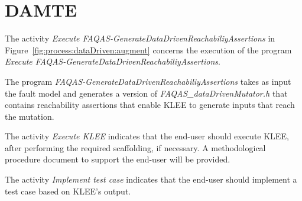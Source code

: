 

\section{DAMTE}


The activity \emph{Execute FAQAS-GenerateDataDrivenReachabiliyAssertions} in Figure~\ref{fig:process:dataDriven:augment} concerns the execution of the program \emph{Execute FAQAS-GenerateDataDrivenReachabiliyAssertions}.

The program \emph{FAQAS-GenerateDataDrivenReachabiliyAssertions} takes as input the fault model and generates a version of \emph{FAQAS\_dataDrivenMutator.h} that contains reachability assertions that enable KLEE to generate inputs that reach the mutation.

The activity \emph{Execute KLEE} indicates that the end-user should execute KLEE, after performing the required scaffolding, if necessary. A methodological procedure document to support the end-user will be provided.

The activity \emph{Implement test case} indicates that the end-user should implement a test case based on KLEE's output.
